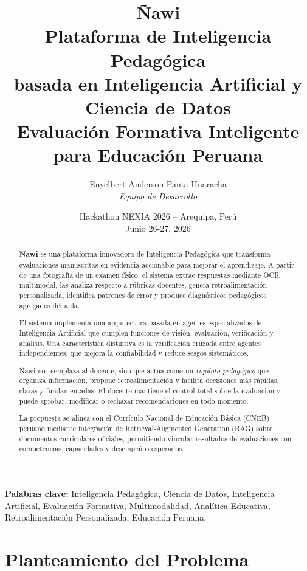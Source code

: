 \documentclass[12pt]{article}
\title{%
\textbf{Ñawi}\\
\textbf{Plataforma de Inteligencia Pedagógica}\\
\textbf{basada en Inteligencia Artificial y Ciencia de Datos}\\
\vspace{0.5cm}
{\large Evaluación Formativa Inteligente para Educación Peruana}
}
\author{Enyelbert Anderson Panta Huaracha \\ \textit{Equipo de Desarrollo}}
\date{Hackathon NEXIA 2026 -- Arequipa, Perú \\ Junio 26-27, 2026}
\begin{document}
\maketitle

\begin{abstract}

\textbf{Ñawi} es una plataforma innovadora de Inteligencia Pedagógica que transforma evaluaciones manuscritas en evidencia accionable para mejorar el aprendizaje. A partir de una fotografía de un examen físico, el sistema extrae respuestas mediante OCR multimodal, las analiza respecto a rúbricas docentes, genera retroalimentación personalizada, identifica patrones de error y produce diagnósticos pedagógicos agregados del aula.

El sistema implementa una arquitectura basada en agentes especializados de Inteligencia Artificial que cumplen funciones de visión, evaluación, verificación y análisis. Una característica distintiva es la verificación cruzada entre agentes independientes, que mejora la confiabilidad y reduce sesgos sistemáticos.

Ñawi no reemplaza al docente, sino que actúa como un \textit{copiloto pedagógico} que organiza información, propone retroalimentación y facilita decisiones más rápidas, claras y fundamentadas. El docente mantiene el control total sobre la evaluación y puede aprobar, modificar o rechazar recomendaciones en todo momento.

La propuesta se alinea con el Currículo Nacional de Educación Básica (CNEB) peruano mediante integración de Retrieval-Augmented Generation (RAG) sobre documentos curriculares oficiales, permitiendo vincular resultados de evaluaciones con competencias, capacidades y desempeños esperados.

\end{abstract}

\noindent\textbf{Palabras clave:} Inteligencia Pedagógica, Ciencia de Datos, Inteligencia Artificial, Evaluación Formativa, Multimodalidad, Analítica Educativa, Retroalimentación Personalizada, Educación Peruana.

\newpage

\section{Planteamiento del Problema}
\end{document}
